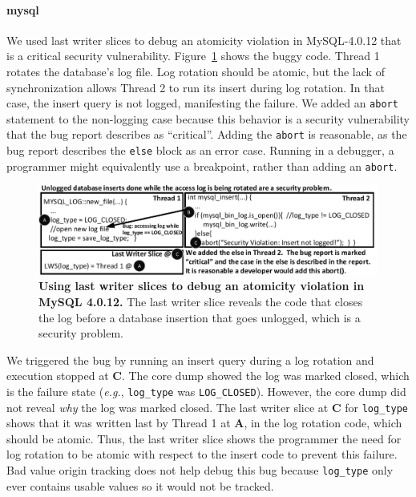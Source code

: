 \documentclass[10pt,nocopyrightspace]{sigplanconf}
\newcommand{\Caption}[1]{\begin{minipage}{.95\columnwidth} \caption{#1} \end{minipage} \vspace{-1.2ex}}
\begin{document}
\paragraph{mysql}

We used last writer slices to debug an atomicity violation in MySQL-4.0.12 that
is a critical security vulnerability.  Figure~\ref{fig:mysqllws} shows the
buggy code.  Thread 1 rotates the database's log file.  Log rotation should be
atomic, but the lack of synchronization allows Thread 2 to run its insert
during log rotation.  In that case, the insert query is not logged, manifesting
the failure.  We added an {\tt abort} statement to the non-logging case because
this behavior is a security vulnerability that the bug report describes as
``critical''.  Adding the {\tt abort} is reasonable, as the bug report
describes the {\tt else} block as an error case.  Running in a debugger, a
programmer might equivalently use a breakpoint, rather than adding an
{\tt abort}.


\begin{figure}[h]
\centering
\includegraphics[width=\columnwidth]{figs/MySQLDebug.pdf}
\Caption{\label{fig:mysqllws}{\bf Using last writer slices to debug an
atomicity violation in MySQL 4.0.12.} The last writer slice reveals the code that closes the log before a database insertion that goes unlogged, which is a security problem.}
\end{figure}

We triggered the bug by running an insert query during a log rotation and
execution stopped at {\bf C}.  The core dump showed the log was marked closed,
which is the failure state ({\em e.g.}, {\tt log\_type} was {\tt LOG\_CLOSED}).
However, the core dump did not reveal {\em why} the log was marked closed.  The
last writer slice at {\bf C} for {\tt log\_type} shows that it was written last
by Thread 1 at {\bf A}, in the log rotation code, which should be atomic.
Thus, the last writer slice shows the programmer the need for log rotation to
be atomic with respect to the insert code to prevent this failure.  Bad value
origin tracking does not help debug this bug because {\tt log\_type} only ever
contains usable values so it would not be tracked.  
\end{document}
